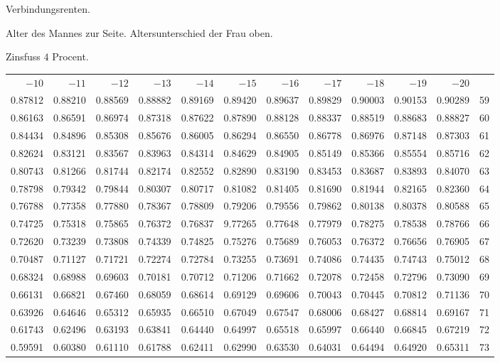 \clearpage
{}
\begin{center}
Verbindungsrenten.\par\smallskip
Alter des Mannes zur Seite. Altersunterschied der Frau oben.\par\smallskip
Zinsfuss \(4\) Procent.\par\medskip
\fontsize{8}{10}\selectfont\setlength{\tabcolsep}{1.3pt}
\begin{tabular}{|rrrrrrrrrrr|r|}
\hline
\(-10\)&\(-11\)&\(-12\)&\(-13\)&\(-14\)&\(-15\)&\(-16\)&\(-17\)&\(-18\)&\(-19\)&\(-20\)&\\[8pt]
0.87812&0.88210&0.88569&0.88882&0.89169&0.89420&0.89637&0.89829&0.90003&0.90153&0.90289&59\\
0.86163&0.86591&0.86974&0.87318&0.87622&0.87890&0.88128&0.88337&0.88519&0.88683&0.88827&60\\
0.84434&0.84896&0.85308&0.85676&0.86005&0.86294&0.86550&0.86778&0.86976&0.87148&0.87303&61\\
0.82624&0.83121&0.83567&0.83963&0.84314&0.84629&0.84905&0.85149&0.85366&0.85554&0.85716&62\\
0.80743&0.81266&0.81744&0.82174&0.82552&0.82890&0.83190&0.83453&0.83687&0.83893&0.84070&63\\
0.78798&0.79342&0.79844&0.80307&0.80717&0.81082&0.81405&0.81690&0.81944&0.82165&0.82360&64\\[5pt]
0.76788&0.77358&0.77880&0.78367&0.78809&0.79206&0.79556&0.79862&0.80138&0.80378&0.80588&65\\
0.74725&0.75318&0.75865&0.76372&0.76837&9.77265&0.77648&0.77979&0.78275&0.78538&0.78766&66\\
0.72620&0.73239&0.73808&0.74339&0.74825&0.75276&0.75689&0.76053&0.76372&0.76656&0.76905&67\\
0.70487&0.71127&0.71721&0.72274&0.72784&0.73255&0.73691&0.74086&0.74435&0.74743&0.75012&68\\
0.68324&0.68988&0.69603&0.70181&0.70712&0.71206&0.71662&0.72078&0.72458&0.72796&0.73090&69\\[5pt]
0.66131&0.66821&0.67460&0.68059&0.68614&0.69129&0.69606&0.70043&0.70445&0.70812&0.71136&70\\
0.63926&0.64646&0.65312&0.65935&0.66510&0.67049&0.67547&0.68006&0.68427&0.68814&0.69167&71\\
0.61743&0.62496&0.63193&0.63841&0.64440&0.64997&0.65518&0.65997&0.66440&0.66845&0.67219&72\\
0.59591&0.60380&0.61110&0.61788&0.62411&0.62990&0.63530&0.64031&0.64494&0.64920&0.65311&73\\

\end{tabular}
\end{center}
